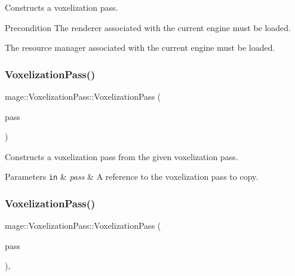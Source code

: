 Constructs a voxelization pass.

\begin{DoxyPrecond}{Precondition}
The renderer associated with the current engine must be loaded. 

The resource manager associated with the current engine must be loaded. 
\end{DoxyPrecond}
\hypertarget{classmage_1_1_voxelization_pass_a846f41639f7c792f9dab58fb1c1095e3}{}\label{classmage_1_1_voxelization_pass_a846f41639f7c792f9dab58fb1c1095e3} 
\subsubsection{\texorpdfstring{Voxelization\+Pass()}{VoxelizationPass()}\hspace{0.1cm}{\footnotesize\ttfamily [2/3]}}
{\footnotesize\ttfamily mage\+::\+Voxelization\+Pass\+::\+Voxelization\+Pass (\begin{DoxyParamCaption}\item[{const \hyperlink{classmage_1_1_voxelization_pass}{Voxelization\+Pass} \&}]{pass }\end{DoxyParamCaption})\hspace{0.3cm}{\ttfamily [delete]}}

Constructs a voxelization pass from the given voxelization pass.


\begin{DoxyParams}[1]{Parameters}
\mbox{\tt in}  & {\em pass} & A reference to the voxelization pass to copy. \\
\hline
\end{DoxyParams}
\hypertarget{classmage_1_1_voxelization_pass_acb45aea18e3895084afea0bc89065fcd}{}\label{classmage_1_1_voxelization_pass_acb45aea18e3895084afea0bc89065fcd} 
\subsubsection{\texorpdfstring{Voxelization\+Pass()}{VoxelizationPass()}\hspace{0.1cm}{\footnotesize\ttfamily [3/3]}}
{\footnotesize\ttfamily mage\+::\+Voxelization\+Pass\+::\+Voxelization\+Pass (\begin{DoxyParamCaption}\item[{\hyperlink{classmage_1_1_voxelization_pass}{Voxelization\+Pass} \&\&}]{pass }\end{DoxyParamCaption})\hspace{0.3cm}{\ttfamily [default]}, {\ttfamily [noexcept]}}

